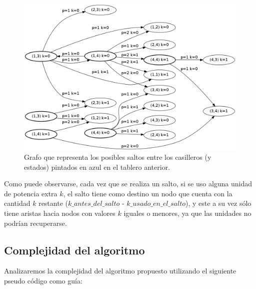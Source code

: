 \begin{figure}[h]
\begin{center}
\includegraphics[scale=0.3]{./img/ej3_grafo.png}
\caption{Grafo que representa los posibles saltos entre los casilleros (y estados) pintados en azul en el tablero anterior.}
\end{center}
\end{figure}

Como puede observarse, cada vez que se realiza un salto, si se uso alguna unidad de potencia extra $k$, el salto tiene como destino un nodo que cuenta con la cantidad $k$ restante ($k\_antes\_del\_salto$ - $k\_usado\_en\_el\_salto$), y este a su vez s\'olo tiene aristas hacia nodos con valores $k$ iguales o menores, ya que las unidades no podr\'ian recuperarse.
\newpage
\subsection{Complejidad del algoritmo}

Analizaremos la complejidad del algoritmo propuesto utilizando el siguiente pseudo c\'odigo como gu\'ia:

